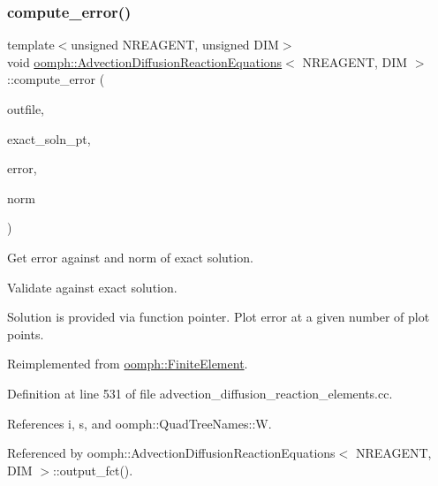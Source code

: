 \subsubsection{\texorpdfstring{compute\+\_\+error()}{compute\_error()}\hspace{0.1cm}{\footnotesize\ttfamily [1/2]}}
{\footnotesize\ttfamily template$<$unsigned N\+R\+E\+A\+G\+E\+NT, unsigned D\+IM$>$ \\
void \hyperlink{classoomph_1_1AdvectionDiffusionReactionEquations}{oomph\+::\+Advection\+Diffusion\+Reaction\+Equations}$<$ N\+R\+E\+A\+G\+E\+NT, D\+IM $>$\+::compute\+\_\+error (\begin{DoxyParamCaption}\item[{std\+::ostream \&}]{outfile,  }\item[{\hyperlink{classoomph_1_1FiniteElement_a690fd33af26cc3e84f39bba6d5a85202}{Finite\+Element\+::\+Steady\+Exact\+Solution\+Fct\+Pt}}]{exact\+\_\+soln\+\_\+pt,  }\item[{double \&}]{error,  }\item[{double \&}]{norm }\end{DoxyParamCaption})\hspace{0.3cm}{\ttfamily [virtual]}}



Get error against and norm of exact solution. 

Validate against exact solution.

Solution is provided via function pointer. Plot error at a given number of plot points. 

Reimplemented from \hyperlink{classoomph_1_1FiniteElement_a73c79a1f1e5b1d334757812a6bbd58ff}{oomph\+::\+Finite\+Element}.



Definition at line 531 of file advection\+\_\+diffusion\+\_\+reaction\+\_\+elements.\+cc.



References i, s, and oomph\+::\+Quad\+Tree\+Names\+::W.



Referenced by oomph\+::\+Advection\+Diffusion\+Reaction\+Equations$<$ N\+R\+E\+A\+G\+E\+N\+T, D\+I\+M $>$\+::output\+\_\+fct().

\mbox{\label{classoomph_1_1AdvectionDiffusionReactionEquations_a4a177abea269ae6063013fe5b3d25ac3}} 
